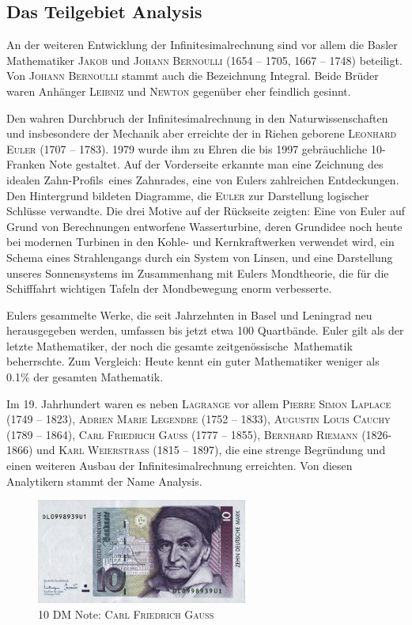 \documentclass[%
<<<<<<< Updated upstream
11pt,%
twoside,%
titlepage,%
german,%
=======
11pt,%
twoside,%
titlepage,%
swissgerman,%
>>>>>>> Stashed changes
headsepline%
]{scrartcl}
\newcommand{\definition}[1]{\colorbox{emerald}{#1}}
\theoremstyle{definition}
\theoremstyle{plain}
\begin{document}
\subsection{Das Teilgebiet Analysis}

An der weiteren Entwicklung der Infinitesimalrechnung sind vor allem die Basler Mathematiker \textsc{Jakob} und \textsc{Johann Bernoulli} (1654 -- 1705, 1667 -- 1748) beteiligt. Von \textsc{Johann Bernoulli} stammt auch die Bezeichnung \glqq Integral\grqq. Beide Brüder waren Anhänger \textsc{Leibniz} und \textsc{Newton} gegenüber eher feindlich gesinnt.

Den wahren Durchbruch der Infinitesimalrechnung in den Naturwissenschaften und insbesondere der Mechanik aber erreichte der in Riehen geborene \textsc{Leonhard Euler} (1707 -- 1783). 1979 wurde ihm zu Ehren die bis 1997 gebräuchliche 10-Franken Note gestaltet.
Auf der Vorderseite erkannte man eine Zeichnung des idealen \glqq Zahn-Profils\grqq\ eines Zahnrades, eine von Eulers zahlreichen Entdeckungen. Den Hintergrund bildeten Diagramme, die \textsc{Euler} zur Darstellung logischer Schlüsse verwandte. Die drei Motive auf der Rückseite zeigten: Eine von Euler auf Grund von Berechnungen entworfene Wasserturbine, deren Grundidee noch heute bei modernen Turbinen in den Kohle- und Kernkraftwerken verwendet wird, ein Schema eines Strahlengangs durch ein System von Linsen, und eine Darstellung unseres Sonnensystems im Zusammenhang mit Eulers Mondtheorie, die für die Schifffahrt wichtigen Tafeln der Mondbewegung enorm verbesserte.

Eulers gesammelte Werke, die seit Jahrzehnten in Basel und Leningrad neu herausgegeben werden, umfassen bis jetzt etwa 100 Quartbände. Euler gilt als der letzte Mathematiker, der noch die gesamte \glqq zeitgenössische\grqq\ Mathematik beherrschte. Zum Vergleich: Heute kennt ein guter Mathematiker weniger als  0.1\% der gesamten Mathematik.

Im 19. Jahrhundert waren es neben \textsc{Lagrange} vor allem \textsc{Pierre Simon Laplace} (1749 -- 1823), \textsc{Adrien Marie Legendre} (1752 -- 1833), \textsc{Augustin Louis Cauchy} (1789 -- 1864), \textsc{Carl Friedrich Gauss} (1777 -- 1855), \textsc{Bernhard Riemann} (1826-1866) und \textsc{Karl Weierstrass} (1815 -- 1897), die eine strenge Begründung und einen weiteren Ausbau der Infinitesimalrechnung erreichten. Von diesen Analytikern stammt der Name \definition{Analysis}.

\begin{figure}
\begin{center}
\includegraphics[width=0.618\textwidth]{pictures/gauss}
\caption{10 DM Note: \textsc{Carl Friedrich Gauss}}
\end{center}
\end{figure}
\end{document}
